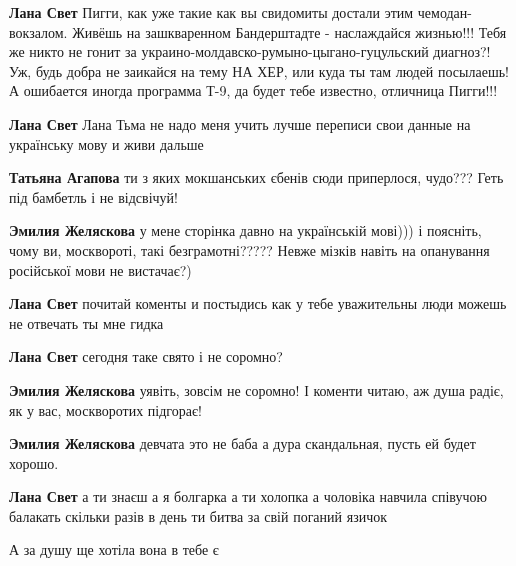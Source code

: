 \begin{itemize}
\begin{itemize}
\textbf{Лана Свет} Пигги, как уже такие как вы свидомиты достали этим
чемодан-вокзалом. Живёшь на зашкваренном Бандерштадте - наслаждайся жизнью!!!
Тебя же никто не гонит за украино-молдавско-румыно-цыгано-гуцульский диагноз?!
Уж, будь добра не заикайся на тему НА ХЕР, или куда ты там людей посылаешь! А
ошибается иногда программа Т-9, да будет тебе известно, отличница Пигги!!!

\textbf{Лана Свет} Лана Тьма не надо меня учить лучше переписи свои данные на
українську мову и живи дальше


\textbf{Татьяна Агапова} ти з яких мокшанських єбенів сюди приперлося, чудо???
Геть під бамбетль і не відсвічуй!


\textbf{Эмилия Желяскова} у мене сторінка давно на українській мові))) і
поясніть, чому ви, москвороті, такі безграмотні????? Невже мізків навіть на
опанування російської мови не вистачає?)

\textbf{Лана Свет} почитай коменты и постыдись как у тебе уважительны люди можешь не отвечать ты мне гидка

\textbf{Лана Свет} сегодня таке свято і не соромно?

\textbf{Эмилия Желяскова} уявіть, зовсім не соромно! І коменти читаю, аж душа радіє, як у вас, москворотих підгорає!

\textbf{Эмилия Желяскова} девчата это не баба а дура скандальная, пусть ей будет хорошо.

\textbf{Лана Свет} а ти знаєш а я болгарка а ти холопка а чоловіка навчила співучою балакать скільки разів в день ти битва за свій поганий язичок

А за душу ще хотіла вона в тебе є


\end{itemize}
\end{itemize}
